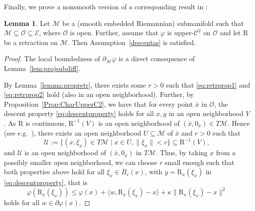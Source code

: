 \documentclass[a4paper, 12pt]{article}
\numberwithin{equation}{section}
\theoremstyle{bolddef}
\theoremstyle{definition}
\theoremstyle{boldplain}
\newtheorem{lemma}[definition]{Lemma}
\newcommand{\clball}{\overline{B}}
\newcommand{\retr}{\mathrm{R}}
\begin{document}
Finally, we prove a nonsmooth version of a corresponding result in \cite{Boumal2018}:
\begin{lemma}
	Let $\mathcal{M}$ be a (smooth embedded Riemannian) submanifold such that $\mathcal{M} \subseteq \mathcal{O} \subseteq \mathcal{E}$, where $\mathcal{O}$ is open. Further, assume that $\varphi$ is upper-$\mathcal{C}^2$ on $\mathcal{O}$ and let $\retr$ be a retraction on $\mathcal{M}$. Then Assumption~\ref{descentas} is satisfied.
\end{lemma}
\begin{proof}
	The local boundedness of $\partial_\mathcal{M} \varphi$ is a direct consequence of Lemma~\ref{lem:projsubdiff}.

	By Lemma~\ref{lemma:propretr}, there exists some $r > 0$ such that \eqref{eq:retrprop1} and \eqref{eq:retrprop2} hold (also in an open neighborhood). Further, by Proposition~\ref{Prop:CharUpperC2}, we have that for every point $\bar x$ in $\mathcal{O}$, the descent property \eqref{eq:descentproperty} holds for all $x, y$ in an open neighborhood $V$. As $\retr$ is continuous, $\retr^{-1}(V)$ is an open neighborhood of $(\bar x, 0_{\bar x}) \in T \mathcal{M}$. Hence (see e.g.\ \cite{doCarmo1992}), there exists an open neighborhood $U \subseteq \mathcal{M}$ of $\bar x$ and $r>0$ such that
	\begin{equation*}
		\mathcal{U} := \{(x, \xi_x) \in T\mathcal{M} \mid x \in U, \|\xi_x\| < r\} \subseteq \retr^{-1}(V),
	\end{equation*}
	and $\mathcal{U}$ is an open neighborhood of $(\bar x, 0_{\bar x})$ in $T\mathcal{M}$. Thus, by taking $x$ from a possibly smaller open neighborhood, we can choose $r$ small enough such that both properties above hold for all $\xi_x \in \clball_r(x)$, with $y = \retr_x(\xi_x)$ in \eqref{eq:descentproperty}, that is
	\begin{equation}\label{eq:descentproperty2}
		\varphi(\retr_x(\xi_x)) \leq \varphi(x) + \langle w, \retr_x(\xi_x) - x \rangle + \kappa \|\retr_x(\xi_x) - x\|^2
	\end{equation}
	holds for all $w \in \partial \varphi(x)$. 


\end{proof}
\end{document}
